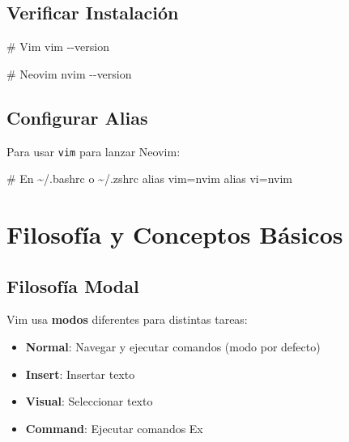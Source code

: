 \documentclass[
  doc,
  floatsintext,
  longtable,
  a4paper,
  nolmodern,
  notxfonts,
  notimes,
  12pt,
  colorlinks=true,linkcolor=blue,citecolor=blue,urlcolor=blue]{apa7}
\newenvironment{Shaded}{\begin{snugshade}}{\end{snugshade}}
\newcommand{\AttributeTok}[1]{\textcolor[rgb]{0.40,0.45,0.13}{#1}}
\newcommand{\BuiltInTok}[1]{\textcolor[rgb]{0.00,0.23,0.31}{#1}}
\newcommand{\CommentTok}[1]{\textcolor[rgb]{0.37,0.37,0.37}{#1}}
\newcommand{\ExtensionTok}[1]{\textcolor[rgb]{0.00,0.23,0.31}{#1}}
\newcommand{\NormalTok}[1]{\textcolor[rgb]{0.00,0.23,0.31}{#1}}
\newcommand{\StringTok}[1]{\textcolor[rgb]{0.13,0.47,0.30}{#1}}
\providecommand{\tightlist}{%
  \setlength{\itemsep}{0pt}\setlength{\parskip}{0pt}}
\begin{document}
\subsection{Verificar Instalación}\label{verificar-instalaciuxf3n}

\begin{Shaded}
\begin{Highlighting}[]
\CommentTok{\# Vim}
\ExtensionTok{vim} \AttributeTok{{-}{-}version}

\CommentTok{\# Neovim}
\ExtensionTok{nvim} \AttributeTok{{-}{-}version}
\end{Highlighting}
\end{Shaded}

\subsection{Configurar Alias}\label{configurar-alias}

Para usar \texttt{vim} para lanzar Neovim:

\begin{Shaded}
\begin{Highlighting}[]
\CommentTok{\# En \textasciitilde{}/.bashrc o \textasciitilde{}/.zshrc}
\BuiltInTok{alias}\NormalTok{ vim=}\StringTok{\textquotesingle{}nvim\textquotesingle{}}
\BuiltInTok{alias}\NormalTok{ vi=}\StringTok{\textquotesingle{}nvim\textquotesingle{}}
\end{Highlighting}
\end{Shaded}

\section{Filosofía y Conceptos
Básicos}\label{filosofuxeda-y-conceptos-buxe1sicos}

\subsection{Filosofía Modal}\label{filosofuxeda-modal}

Vim usa \textbf{modos} diferentes para distintas tareas:

\begin{itemize}
\tightlist
\item
  \textbf{Normal}: Navegar y ejecutar comandos (modo por defecto)
\item
  \textbf{Insert}: Insertar texto
\item
  \textbf{Visual}: Seleccionar texto
\item
  \textbf{Command}: Ejecutar comandos Ex
\end{itemize}
\end{document}
